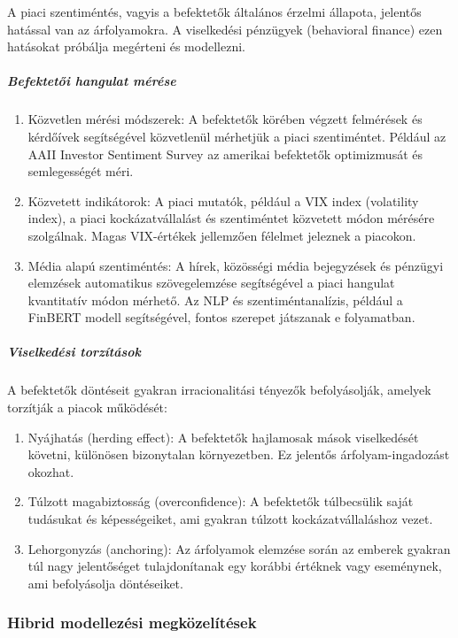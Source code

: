 \documentclass[11pt]{article}
\begin{document}
A piaci szentiméntés, vagyis a befektetők általános érzelmi állapota,
jelentős hatással van az árfolyamokra. A viselkedési pénzügyek
(behavioral finance) ezen hatásokat próbálja megérteni és modellezni.

\subparagraph{Befektetői hangulat
mérése}\label{befektetux151i-hangulat-muxe9ruxe9se}

\begin{enumerate}
\def\labelenumi{\arabic{enumi}.}
\item
  Közvetlen mérési módszerek: A befektetők körében végzett felmérések és
  kérdőívek segítségével közvetlenül mérhetjük a piaci szentiméntet.
  Például az AAII Investor Sentiment Survey az amerikai befektetők
  optimizmusát és semlegességét méri.
\item
  Közvetett indikátorok: A piaci mutatók, például a VIX index
  (volatility index), a piaci kockázatvállalást és szentiméntet
  közvetett módon mérésére szolgálnak. Magas VIX-értékek jellemzően
  félelmet jeleznek a piacokon.
\item
  Média alapú szentiméntés: A hírek, közösségi média bejegyzések és
  pénzügyi elemzések automatikus szövegelemzése segítségével a piaci
  hangulat kvantitatív módon mérhető. Az NLP és szentiméntanalízis,
  például a FinBERT modell segítségével, fontos szerepet játszanak e
  folyamatban.
\end{enumerate}

\subparagraph{Viselkedési
torzítások}\label{viselkeduxe9si-torzuxedtuxe1sok}

A befektetők döntéseit gyakran irracionalitási tényezők befolyásolják,
amelyek torzítják a piacok működését:

\begin{enumerate}
\def\labelenumi{\arabic{enumi}.}
\item
  Nyájhatás (herding effect): A befektetők hajlamosak mások viselkedését
  követni, különösen bizonytalan környezetben. Ez jelentős
  árfolyam-ingadozást okozhat.
\item
  Túlzott magabiztosság (overconfidence): A befektetők túlbecsülik saját
  tudásukat és képességeiket, ami gyakran túlzott kockázatvállaláshoz
  vezet.
\item
  Lehorgonyzás (anchoring): Az árfolyamok elemzése során az emberek
  gyakran túl nagy jelentőséget tulajdonítanak egy korábbi értéknek vagy
  eseménynek, ami befolyásolja döntéseiket.
\end{enumerate}

\subsubsection{Hibrid modellezési
megközelítések}\label{hibrid-modellezuxe9si-megkuxf6zeluxedtuxe9sek}
\end{document}
